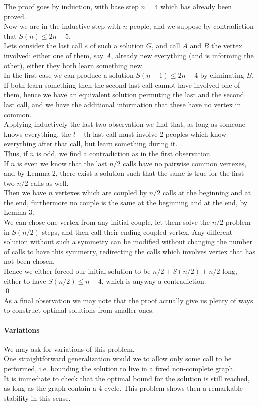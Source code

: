 \documentclass{article}
\begin{document}
The proof goes by induction, with base step $n=4$ which has already been proved.\\
Now we are in the inductive step with $n$ people, and we suppose by contradiction that $S(n)\leq 2n-5$.\\
Lets consider the last call $e$ of such a solution $G$, and call $A$ and $B$ the vertex involved: either one of them, say $A$, already new everything (and is informing the other), either they both learn something new.\\
In the first case we can produce a solution $S(n-1)\leq 2n-4$ by eliminating $B$.\\
If both learn something then the second last call cannot have involved one of them, hence we have an equivalent solution permuting the last and the second last call, and we have the additional information that these have no vertex in common.\\
Applying inductively the last two observation we find that, as long as someone knows everything, the $l-$th last call must involve $2$ peoples which know everything after that call, but learn something during it.\\
Thus, if $n$ is odd, we find a contradiction as in the first observation.\\
If $n$ is even we know that the last $n/2$ calls have no pairwise common vertexes, and by Lemma 2, there exist a solution such that the same is true for the first two $n/2$ calls as well.\\
Then we have $n$ vertexes which are coupled by $n/2$ calls at the beginning and at the end, furthermore no couple is the same at the beginning and at the end, by Lemma 3.\\
We can chose one vertex from any initial couple, let them solve the $n/2$ problem in $S(n/2)$ steps, and then call their ending coupled vertex. Any different solution without such a symmetry can be modified without changing the number of calls to have this symmetry, redirecting the calls which involves vertex that has not been chosen.\\
Hence we either forced our initial solution to be $n/2+S(n/2)+n/2$ long, either to have $S(n/2)\leq n-4$, which is anyway a contradiction.\\\qed\\
As a final observation we may note that the proof actually give us plenty of ways to construct optimal solutions from smaller ones.
\paragraph*{Variations\\}
We may ask for variations of this problem.\\
One straightforward generalization would we to allow only some call to be performed, i.e. bounding the solution to live in a fixed non-complete graph.\\
It is immediate to check that the optimal bound for the solution is still reached, as long as the graph contain a 4-cycle. This problem shows then a remarkable stability in this sense.
\end{document}
